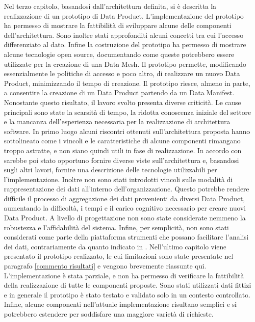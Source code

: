 \documentclass[12pt]{report}
\begin{document}
Nel terzo capitolo, basandosi dall'architettura definita, si è descritta la realizzazione di un prototipo di Data Product.
L'implementazione del prototipo ha permesso di mostrare la fattibilità di sviluppare alcune delle componenti dell'architettura.
Sono inoltre stati approfonditi alcuni concetti tra cui l'accesso differenziato al dato.
Infine la costruzione del prototipo ha permesso di mostrare alcune tecnologie open source, documentando come queste potrebbero essere utilizzate per la creazione di una Data Mesh.
Il prototipo permette, modificando essenzialmente le politiche di accesso e poco altro, di realizzare un nuovo Data Product, minimizzando il tempo di creazione.
Il prototipo riesce, almeno in parte, a consentire la creazione di un Data Product partendo da un Data Manifest.
Nonostante questo risultato, il lavoro svolto presenta diverse criticità.
Le cause principali sono state la scarsità di tempo, la ridotta conoscenza iniziale del settore e la mancanza dell'esperienza necessaria per la realizzazione di architettura software.
In primo luogo alcuni riscontri ottenuti sull'architettura proposta hanno sottolineato come i vincoli e le caratteristiche di alcune componenti  rimangano troppo astratte, e non siano quindi utili in fase di realizzazione.
In accordo con \cite{perry_foundations_1992} sarebbe poi stato opportuno fornire diverse viste sull'architettura e, basandosi sugli altri lavori, fornire una descrizione delle tecnologie utilizzabili per l'implementazione.
Inoltre non sono stati introdotti vincoli sulle modalità di rappresentazione dei dati all'interno dell'organizzazione. 
Questo potrebbe rendere difficile il processo di aggregazione dei dati provenienti da diversi Data Product, aumentando la difficoltà, i tempi e il carico cognitivo necessario per creare nuovi Data Product.
A livello di progettazione non sono state considerate nemmeno la robustezza e l'affidabilità del sistema.
Infine, per semplicità, non sono stati considerati come parte della piattaforma strumenti che possano facilitare l'analisi dei dati, contrariamente da quanto indicato in \cite{dehghani_data_2022}.
Nell'ultimo capitolo viene presentato il prototipo realizzato,
le cui limitazioni sono state presentate nel paragrafo \ref{commento risultati} e vengono brevemente riassunte qui.
L'implementazione è stata parziale, e non ha permesso di verificare la fattibilità della realizzazione di tutte le componenti proposte.
Sono stati utilizzati dati fittizi e in generale il prototipo è stato testato e validato solo in un contesto controllato.
Infine, alcune componenti nell'attuale implementazione risultano semplici e si potrebbero estendere per soddisfare una maggiore varietà di richieste.
\end{document}
